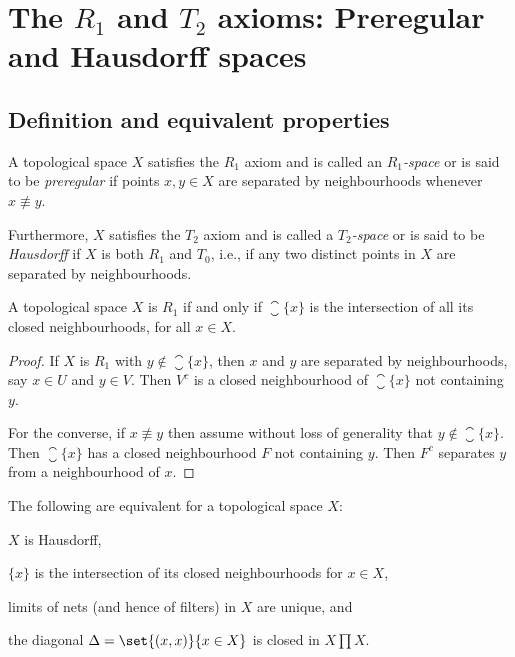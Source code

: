 \documentclass[article, a4paper, 11pt, oneside]{memoir}
\numberwithin{equation}{chapter}
\begin{document}
\chapter[The R1 and T2 axioms: Preregular and Hausdorff spaces][The $R_1$ and $T_2$ axioms: Preregular and Hausdorff spaces]{The $R_1$ and $T_2$ axioms: Preregular and Hausdorff spaces}


\section{Definition and equivalent properties}

\begin{definition}
    A topological space $X$ satisfies the $R_1$ axiom and is called an \emph{$R_1$-space} or is said to be \emph{preregular} if points $x,y \in X$ are separated by neighbourhoods whenever $x \not\equiv y$.
    
    Furthermore, $X$ satisfies the $T_2$ axiom and is called a \emph{$T_2$-space} or is said to be \emph{Hausdorff} if $X$ is both $R_1$ and $T_0$, i.e., if any two distinct points in $X$ are separated by neighbourhoods.
\end{definition}


\begin{proposition}
    \label{thm:R1-equivalent-properties}
    A topological space $X$ is $R_1$ if and only if $\closure{\{x\}}$ is the intersection of all its closed neighbourhoods, for all $x \in X$.
\end{proposition}

\begin{proof}
    If $X$ is $R_1$ with $y \not\in \closure{\{x\}}$, then $x$ and $y$ are separated by neighbourhoods, say $x \in U$ and $y \in V$. Then $V^c$ is a closed neighbourhood of $\closure{\{x\}}$ not containing $y$.

    For the converse, if $x \not\equiv y$ then assume without loss of generality that $y \not\in \closure{\{x\}}$. Then $\closure{\{x\}}$ has a closed neighbourhood $F$ not containing $y$. Then $F^c$ separates $y$ from a neighbourhood of $x$.
\end{proof}


\begin{proposition}
    \label{thm:Hausdorff-equivalent-properties}
    The following are equivalent for a topological space $X$:
    \begin{enumprop}
        \item \label{enum:T2-space} $X$ is Hausdorff,
        \item $\{x\}$ is the intersection of its closed neighbourhoods for $x \in X$,
        \item \label{enum:T2-limits_unique} limits of nets (and hence of filters) in $X$ are unique, and
        \item \label{enum:T2-closed_diagonal} the diagonal $\Delta = \set{(x,x)}{x \in X}$ is closed in $X \prod X$.
    \end{enumprop}
\end{proposition}
\end{document}
